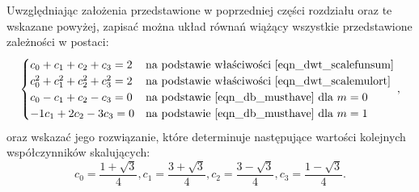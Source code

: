 Uwzględniając założenia przedstawione w poprzedniej części rozdziału oraz te wskazane powyżej, zapisać można układ równań wiążący wszystkie przedstawione zależności w postaci:
\begin{equation}
\begin{cases}
	c_{0} + c_{1} + c_{2} + c_{3} = 2                 & $na podstawie właściwości \eqref{eqn_dwt_scalefunsum}$ \\
	c_{0}^{2} + c_{1}^{2} + c_{2}^{2} + c_{3}^{2} = 2 & $na podstawie właściwości \eqref{eqn_dwt_scalemulort}$ \\
	c_{0} - c_{1} + c_{2} - c_{3} = 0                 & $na podstawie \eqref{eqn_db_musthave} dla $ m = 0 \\
	- 1 c_{1} + 2 c_{2} - 3 c_{3} = 0                 & $na podstawie \eqref{eqn_db_musthave} dla $ m = 1
\end{cases}
\label{eqn_db2_system},
\end{equation}
oraz wskazać jego rozwiązanie, które determinuje następujące wartości kolejnych współczynników skalujących:
\begin{equation}
c_{0} = \frac{1 + \sqrt{3}}{4}, c_{1} = \frac{3 + \sqrt{3}}{4}, c_{2} = \frac{3 - \sqrt{3}}{4}, c_{3} = \frac{1 - \sqrt{3}}{4} \label{eqn_db2_coefs}.
\end{equation}

